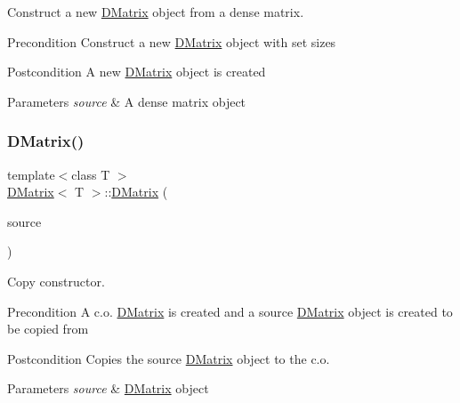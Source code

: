 Construct a new \mbox{\hyperlink{class_d_matrix}{D\+Matrix}} object from a dense matrix. 

\begin{DoxyPrecond}{Precondition}
Construct a new \mbox{\hyperlink{class_d_matrix}{D\+Matrix}} object with set sizes 
\end{DoxyPrecond}
\begin{DoxyPostcond}{Postcondition}
A new \mbox{\hyperlink{class_d_matrix}{D\+Matrix}} object is created 
\end{DoxyPostcond}

\begin{DoxyParams}{Parameters}
{\em source} & A dense matrix object \\
\hline
\end{DoxyParams}
\mbox{\label{class_d_matrix_a3bd6591c7b6cddbbb4fda8d036c59dac}} 
\subsubsection{\texorpdfstring{DMatrix()}{DMatrix()}\hspace{0.1cm}{\footnotesize\ttfamily [4/5]}}
{\footnotesize\ttfamily template$<$class T $>$ \\
\mbox{\hyperlink{class_d_matrix}{D\+Matrix}}$<$ T $>$\+::\mbox{\hyperlink{class_d_matrix}{D\+Matrix}} (\begin{DoxyParamCaption}\item[{const \mbox{\hyperlink{class_d_matrix}{D\+Matrix}}$<$ T $>$ \&}]{source }\end{DoxyParamCaption})}



Copy constructor. 

\begin{DoxyPrecond}{Precondition}
A c.\+o. \mbox{\hyperlink{class_d_matrix}{D\+Matrix}} is created and a source \mbox{\hyperlink{class_d_matrix}{D\+Matrix}} object is created to be copied from 
\end{DoxyPrecond}
\begin{DoxyPostcond}{Postcondition}
Copies the source \mbox{\hyperlink{class_d_matrix}{D\+Matrix}} object to the c.\+o. 
\end{DoxyPostcond}

\begin{DoxyParams}{Parameters}
{\em source} & \mbox{\hyperlink{class_d_matrix}{D\+Matrix}} object \\
\hline
\end{DoxyParams}
\mbox{\label{class_d_matrix_a637d095ef25df70c10175a90b12d49c3}} 
